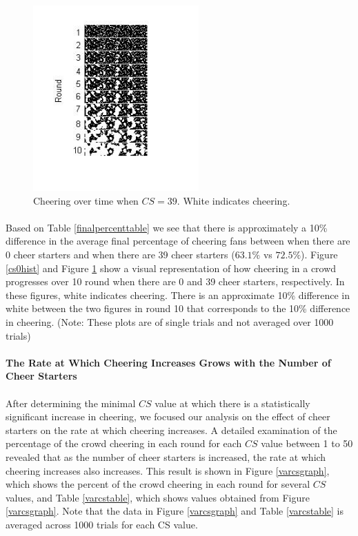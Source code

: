 \documentclass[oneside,12pt]{report}
\begin{document}
 \begin{figure} [h!]
    		\begin{center}
    			\includegraphics [width=2.5in] {n=39,46.jpg}
    			\caption [Pictorial Representation of Cheering Over Time with 39 Cheer Starters] {Cheering over time when $CS=39$. White indicates cheering.}
    		\label{cs39hist}
    		\end{center}
 \end {figure}	

\paragraph{}
Based on Table \ref{finalpercenttable} we see that there is approximately a 10\% difference in the average final percentage of cheering fans between when there are 0 cheer starters and when there are 39 cheer starters ($63.1\%$ vs $72.5\%$). Figure \ref{cs0hist} and Figure \ref{cs39hist} show a visual representation of how cheering in a crowd progresses over 10 round when there are 0 and 39 cheer starters, respectively. In these figures, white indicates cheering. There is an approximate 10\% difference in white between the two figures in round 10 that corresponds to the 10\% difference in cheering. (Note: These plots are of single trials and not averaged over 1000 trials)

\paragraph{The Rate at Which Cheering Increases Grows with the Number of Cheer Starters}
\paragraph{}
After determining the minimal $CS$ value at which there is a statistically significant increase in cheering, we focused our analysis on the effect of cheer starters on the rate at which cheering increases. A detailed examination of the percentage of the crowd cheering in each round for each $CS$ value between 1 to 50 revealed that as the number of cheer starters is increased, the rate at which cheering increases also increases. This result is shown in Figure \ref{varcsgraph}, which shows the percent of the crowd cheering in each round for several $CS$ values, and Table \ref{varcstable}, which shows values obtained from Figure \ref{varcsgraph}. Note that the data in Figure \ref{varcsgraph} and Table \ref{varcstable} is averaged across 1000 trials for each CS value. 
\end{document}
